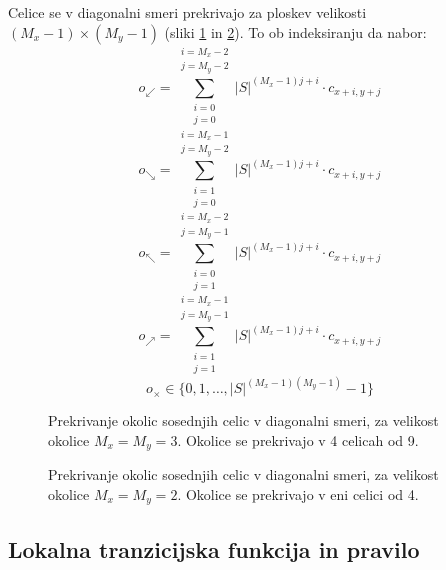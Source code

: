 \documentclass[12pt,a4paper,openany,twoside]{book}
\begin{document}
Celice se v diagonalni smeri prekrivajo za ploskev velikosti \((M_x-1) \times (M_y-1)\) (sliki \ref{overlap_diagonal_moore} in \ref{overlap_diagonal_quad}).
To ob indeksiranju da nabor:
\begin{equation}
o_{\swarrow} = \sum_{\substack{i=0 \\ j=0}}^{\substack{i=M_x-2 \\ j=M_y-2}} |S|^{(M_x-1) j + i} \cdot c_{x+i,y+j}
\end{equation}
\begin{equation}
o_{\searrow} = \sum_{\substack{i=1 \\ j=0}}^{\substack{i=M_x-1 \\ j=M_y-2}} |S|^{(M_x-1) j + i} \cdot c_{x+i,y+j}
\end{equation}
\begin{equation}
o_{\nwarrow} = \sum_{\substack{i=0 \\ j=1}}^{\substack{i=M_x-2 \\ j=M_y-1}} |S|^{(M_x-1) j + i} \cdot c_{x+i,y+j}
\end{equation}
\begin{equation}
o_{\nearrow} = \sum_{\substack{i=1 \\ j=1}}^{\substack{i=M_x-1 \\ j=M_y-1}} |S|^{(M_x-1) j + i} \cdot c_{x+i,y+j}
\end{equation}
\begin{equation}
o_{\times} \in \{0, 1, \ldots, |S|^{(M_x-1)(M_y-1)}-1\}
\end{equation}

\begin{figure}[htb]
\centerline{}
\caption[Prekrivanje okolic \(3 \times 3\) - diagonalno.]
{Prekrivanje okolic sosednjih celic v diagonalni smeri, za velikost okolice \(M_x=M_y=3\).
Okolice se prekrivajo v 4 celicah od 9.}
\label{overlap_diagonal_moore}
\end{figure}

\begin{figure}[htb]
\centerline{}
\caption[Prekrivanje okolic \(2 \times 2\) - diagonalno.]
{Prekrivanje okolic sosednjih celic v diagonalni smeri, za velikost okolice \(M_x=M_y=2\).
Okolice se prekrivajo v eni celici od 4.}
\label{overlap_diagonal_quad}
\end{figure}

\subsection{Lokalna tranzicijska funkcija in pravilo}
\end{document}
